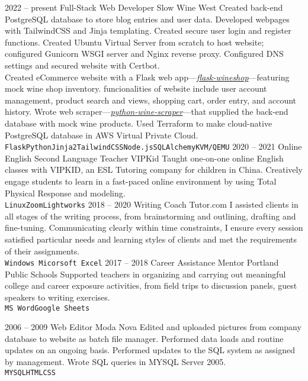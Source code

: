 \documentclass[9pt]{developercv} %
\begin{document}
\begin{entrylist}
		\entry
		{2022 -- present}
		{Full-Stack Web Developer}
		{Slow Wine West}
		{Created back-end PostgreSQL database to store blog entries and user data. Developed webpages with TailwindCSS and
		Jinja templating. Created secure user login and register functions. Created Ubuntu Virtual Server from scratch to host
		website; configured Gunicorn WSGI server and Nginx reverse proxy. Configured DNS settings and secured website with 
		Certbot.\\
		
		Created eCommerce website with a Flask web app—{\href{https://github.com/eriklolson/flask-wineshop}{\itshape flask-wineshop}}—featuring 
		mock wine shop inventory. funcionalities of website include user account management, product search and views, shopping cart, order entry, and 
		account history. Wrote web scraper—{\href{https://github.com/eriklolson/python-wine-scraper}{\itshape python-wine-scraper}}—that 
		supplied the back-end database with mock wine products. Used Terraform to make cloud-native PostgreSQL database in 
		AWS Virtual Private Cloud.\\ \texttt{Flask}\slashsep\texttt{Python}\slashsep\texttt{Jinja2}\slashsep\texttt{TailwindCSS}\slashsep\texttt{Node.js}\slashsep\texttt{SQLAlchemy}\slashsep\texttt{KVM/QEMU}}
	\entry
		{2020 -- 2021}
		{Online English Second Language Teacher}
		{VIPKid}
		{Taught one-on-one online English classes with VIPKID, an ESL Tutoring company for children in China. Creatively engage students to learn in 		a fast-paced online environment by using Total Physical Response and modeling. 
		\\ \texttt{Linux}\slashsep\texttt{Zoom}\slashsep\texttt{Lightworks}}
	\entry
		{2018 -- 2020}
		{Writing Coach}
		{Tutor.com}
		{I assisted clients in all stages of the writing process, from
		brainstorming and outlining, drafting and fine-tuning. Communicating clearly
		within time constraints, I ensure every session satisfied particular needs and
		learning styles of clients and met the requirements of their assignments.
		\\ \texttt{Windows}\slashsep\texttt{ Micorsoft Excel}}
	\entry
		{2017 -- 2018}
		{Career Assistance Mentor}
		{Portland Public Schools}
		{Supported teachers in organizing and carrying out meaningful college and
		career exposure activities, from field trips to discussion panels, guest
		speakers to writing exercises.
		\\ \texttt{MS Word}\slashsep\texttt{Google Sheets}}
		
	\entry
		{2006 -- 2009}
		{Web Editor}
		{Moda Nova}
		{Edited and uploaded pictures from company database to website as batch file manager. Performed data loads and routine updates on an ongoing 		basis. Performed updates to the SQL system as assigned by management. Wrote SQL queries in MYSQL Server 2005.
		\\ \texttt{MYSQL}\slashsep\texttt{HTML}\slashsep\texttt{CSS}}
\end{entrylist}
\end{document}
